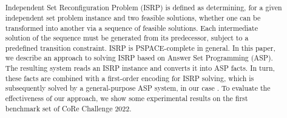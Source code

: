 \usepackage{color}

\title{
}


\author{%
\and
{}
\and
{}
\and
{}
\and
{}
}



\begin{abstract}
Independent Set Reconfiguration Problem (ISRP) is defined as determining,
for a given independent set problem instance and two feasible solutions,
whether one can be transformed into another via a sequence of feasible
solutions. Each intermediate solution of the sequence must be
generated from its predecessor, subject to a predefined transition
constraint. ISRP is PSPACE-complete in general.
%
In this paper, we describe an approach to solving ISRP
based on Answer Set Programming (ASP).
The resulting system reads an ISRP instance and converts it into ASP facts.
In turn, these facts are combined with a first-order encoding for ISRP
solving, which is subsequently solved by a general-purpose ASP system,
in our case {\clingo}.
To evaluate the effectiveness of our approach,
we show some experimental results on the first
benchmark set of CoRe Challenge 2022.
\end{abstract}

\def\Style{``jsaiac.sty''}
\def\BibTeX{{\rm B\kern-.05em{\sc i\kern-.025em b}\kern-.08em%
 T\kern-.1667em\lower.7ex\hbox{E}\kern-.125emX}}
\def\JBibTeX{\leavevmode\lower .6ex\hbox{J}\kern-0.15em\BibTeX}
\def\LaTeXe{\LaTeX\kern.15em2$_{\textstyle\varepsilon}$}


\maketitle



